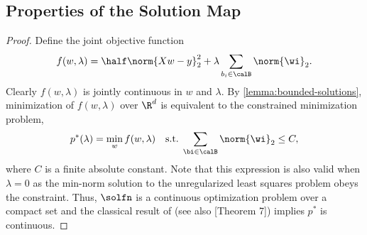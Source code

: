 \subsection{Properties of the Solution Map}\label{app:solution-map}

\begin{proof}
	Define the joint objective function
	\[
		f(w, \lambda) = \half \norm{X w - y}_2^2 + \lambda \sum_{b_i \in \calB} \norm{\wi}_2.
	\]
	Clearly \( f(w, \lambda) \) is jointly continuous in \( w \) and \( \lambda \).
	By \cref{lemma:bounded-solutions}, minimization of
	\( f(w, \lambda) \) over \( \R^d \) is equivalent to the
	constrained minimization problem,
	\[
		p^*(\lambda) = \min_{w} f(w, \lambda) \quad \text{s.t.} \; \sum_{\bi \in \calB} \norm{\wi}_2 \leq C,
	\]
	where \( C \) is a finite absolute constant.
	Note that this expression is also valid when \( \lambda = 0 \) as the
	min-norm solution to the unregularized least squares problem
	obeys the constraint.
	Thus, \( \solfn \) is a continuous optimization problem over a compact
	set and the classical result of \citet{berge1997topological}
	(see also \citet{hogan1973point}[Theorem 7]) implies
	\( p^* \) is continuous.
\end{proof}




